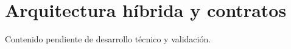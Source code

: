 \section{Arquitectura híbrida y contratos}

Contenido pendiente de desarrollo técnico y validación.
